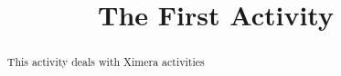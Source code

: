 \documentclass{ximera}
\title{The First Activity}
\begin{document}
  
\begin{abstract}  
	This activity deals with Ximera activities 
\end{abstract}  
\maketitle  
\end{document}
